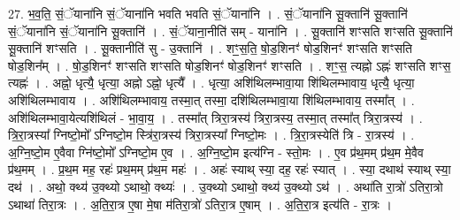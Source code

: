\documentclass[17pt]{extarticle}
\begin{document}
27. भ॒व॒ति॒ सं॒ॅयाना॑नि सं॒ॅयाना॑नि भवति भवति सं॒ॅयाना॑नि । . सं॒ॅयाना॑नि सू॒क्तानि॑ सू॒क्तानि॑ सं॒ॅयाना॑नि सं॒ॅयाना॑नि सू॒क्तानि॑ । . सं॒ॅयाना॒नीति॑ सम् - याना॑नि । . सू॒क्तानि॑ शꣳसति शꣳसति सू॒क्तानि॑ सू॒क्तानि॑ शꣳसति । . सू॒क्तानीति॑ सु - उ॒क्तानि॑ । . शꣳ॒॒स॒ति॒ षो॒ड॒शिनꣳ॑ षोड॒शिनꣳ॑ शꣳसति शꣳसति षोड॒शिन᳚म् । . षो॒ड॒शिनꣳ॑ शꣳसति शꣳसति षोड॒शिनꣳ॑ षोड॒शिनꣳ॑ शꣳसति । . शꣳ॒॒स॒ त्यह्नो ऽह्नः॑ शꣳसति शꣳस॒ त्यह्नः॑ । . अह्नो॒ धृत्यै॒ धृत्या॒ अह्नो ऽह्नो॒ धृत्यै᳚ । . धृत्या॒ अशि॑थिलम्भावा॒या शि॑थिलम्भावाय॒ धृत्यै॒ धृत्या॒ अशि॑थिलम्भावाय । . अशि॑थिलम्भावाय॒ तस्मा॒त् तस्मा॒ दशि॑थिलम्भावा॒या शि॑थिलम्भावाय॒ तस्मा᳚त् । . अशि॑थिलम्भावा॒येत्यशि॑थिलं - भा॒वा॒य॒ । . तस्मा᳚त् त्रिरा॒त्रस्य॑ त्रिरा॒त्रस्य॒ तस्मा॒त् तस्मा᳚त् त्रिरा॒त्रस्य॑ । . त्रि॒रा॒त्रस्या᳚ ग्निष्टो॒मो᳚ ऽग्निष्टो॒म स्त्रि॑रा॒त्रस्य॑ त्रिरा॒त्रस्या᳚ ग्निष्टो॒मः । . त्रि॒रा॒त्रस्येति॑ त्रि - रा॒त्रस्य॑ । . अ॒ग्नि॒ष्टो॒म ए॒वैवा ग्नि॑ष्टो॒मो᳚ ऽग्निष्टो॒म ए॒व । . अ॒ग्नि॒ष्टो॒म इत्य॑ग्नि - स्तो॒मः । . ए॒व प्र॑थ॒मम् प्र॑थ॒म मे॒वैव प्र॑थ॒मम् । . प्र॒थ॒म मह॒ रहः॑ प्रथ॒मम् प्र॑थ॒म महः॑ । . अहः॑ स्याथ् स्या॒ दह॒ रहः॑ स्यात् । . स्या॒ दथाथ॑ स्याथ् स्या॒ दथ॑ । . अथो॒ क्थ्य॑ उ॒क्थ्यो ऽथाथो॒ क्थ्यः॑ । . उ॒क्थ्यो ऽथाथो॒ क्थ्य॑ उ॒क्थ्यो ऽथ॑ । . अथा॑ति रा॒त्रो॑ ऽतिरा॒त्रो ऽथाथा॑ तिरा॒त्रः । . अ॒ति॒रा॒त्र ए॒षा मे॒षा म॑तिरा॒त्रो॑ ऽतिरा॒त्र ए॒षाम् । . अ॒ति॒रा॒त्र इत्य॑ति - रा॒त्रः । \newline
\end{document}
